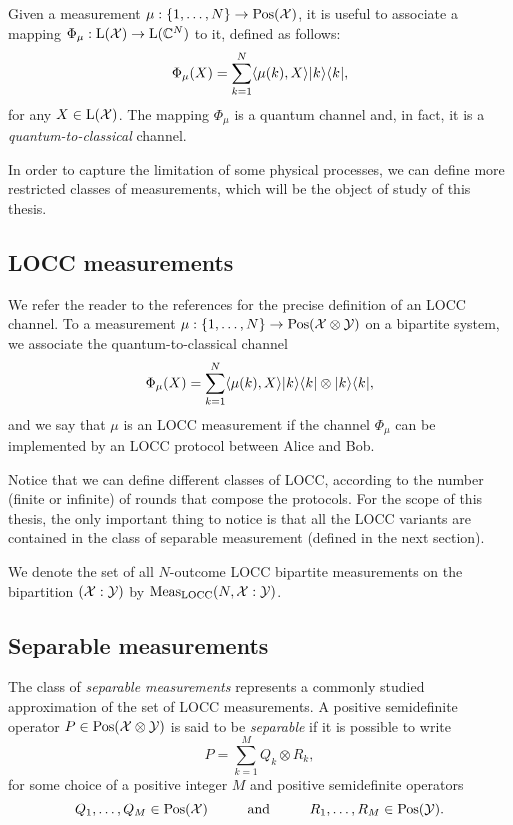 Given a measurement $\mu: \{1, \ldots, N \} \rightarrow \mathrm{Pos}(\mathcal{X})$,
it is useful to associate a mapping $\Phi_{\mu}:\mathrm{L}(\mathcal{X})\rightarrow\mathrm{L}(\mathbb{C}^{N})$ to it,
defined as follows:
\begin{equation}
\label{eq:measurement-channel}
  \Phi_{\mu}(X) = \sum_{k=1}^{N}\langle \mu(k) , X\rangle\lvert\mspace{0.5mu} k \mspace{0.5mu} \rangle\langle\mspace{0.5mu} k \mspace{0.5mu} \rvert,
\end{equation}
for any $X\in\mathrm{L}(\mathcal{X})$. The mapping $\Phi_{\mu}$ is a quantum channel and, in fact,
it is a \emph{quantum-to-classical} channel.

In order to capture the limitation of some physical processes, we can define more restricted 
classes of measurements, which will be the object of study of this thesis.

\subsection{LOCC measurements}

We refer the reader to the references \cite{Mancinska13,Watrous15} for the precise
definition of an LOCC channel.
To a measurement $\mu: \{1, \ldots, N \} \rightarrow \mathrm{Pos}(\mathcal{X}\otimes\mathcal{Y})$ on a bipartite
system, we associate the quantum-to-classical channel
\begin{equation}
\label{eq:measurement-channel-bipartite}
  \Phi_{\mu}(X) = \sum_{k=1}^{N}\langle \mu(k) , X\rangle\lvert\mspace{0.5mu} k \mspace{0.5mu} \rangle\langle\mspace{0.5mu} k \mspace{0.5mu} \rvert\otimes\lvert\mspace{0.5mu} k \mspace{0.5mu} \rangle\langle\mspace{0.5mu} k \mspace{0.5mu} \rvert,
\end{equation}
and we say that $\mu$ is an LOCC measurement if the channel $\Phi_{\mu}$ can be 
implemented by an LOCC protocol between Alice and Bob.

Notice that we can define different classes of LOCC, 
according to the number (finite or infinite) of rounds that compose the protocols.
For the scope of this thesis, the only important thing to notice is that all the LOCC variants
are contained in the class of separable measurement (defined in the next section).

We denote the set of all $N$-outcome LOCC bipartite measurements 
on the bipartition $(\mathcal{X}:\mathcal{Y})$ by $\mathrm{Meas}_{\mathrm{LOCC}}(N, \mathcal{X}:\mathcal{Y})$.

\subsection{Separable measurements}

The class of \emph{separable measurements} represents a commonly studied
approximation of the set of LOCC measurements.
A positive semidefinite operator $P\in\mathrm{Pos}(\mathcal{X}\otimes\mathcal{Y})$ is said to be
\emph{separable} if it is possible to write
\begin{equation}
  P = \sum_{k = 1}^{M} Q_k \otimes R_k,
\end{equation}
for some choice of a positive integer $M$ and positive semidefinite operators
\begin{equation}
  Q_1,\ldots,Q_M \in \mathrm{Pos}(\mathcal{X})
  \hspace*{1cm}\mbox{and}\hspace*{1cm}
  R_1,\ldots,R_M\in\mathrm{Pos}(\mathcal{Y}).
\end{equation}

